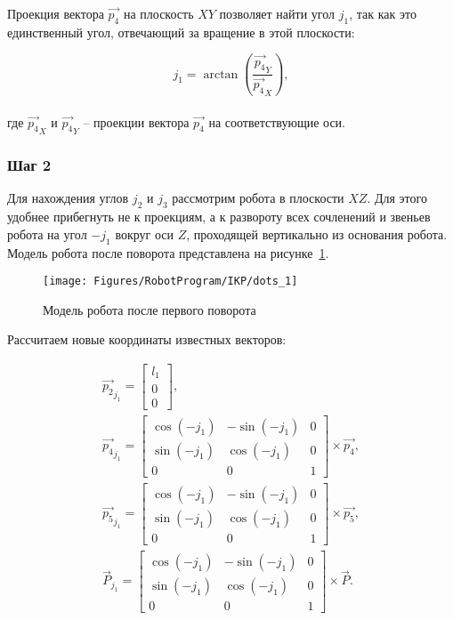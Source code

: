 Проекция вектора $\overrightarrow{p_4}$ на плоскость $XY$ позволяет найти угол $j_1$, так как это единственный угол, отвечающий за вращение в этой плоскости:

\begin{equation*}
    j_1 = \arctan \left( \dfrac{\overrightarrow{p_4}_Y}{\overrightarrow{p_4}_X} \right),
\end{equation*} \\
где $\overrightarrow{p_4}_X$ и $\overrightarrow{p_4}_Y$ -- проекции вектора $\overrightarrow{p_4}$ на соответствующие оси.

\subsubsection*{Шаг 2}
Для нахождения углов $j_2$ и $j_3$ рассмотрим робота в плоскости $XZ$.
Для этого удобнее прибегнуть не к проекциям, а к развороту всех сочленений и звеньев робота на угол $-j_1$ вокруг оси $Z$, проходящей вертикально из основания робота.
Модель робота после поворота представлена на рисунке~\ref{fig:RobotProgram:IKP:dots_1}.

\begin{figure}[H]
    \centering
    \vspace{14pt}
    \texttt{[image: Figures/RobotProgram/IKP/dots\_1]}
    \caption{Модель робота после первого поворота}
    \label{fig:RobotProgram:IKP:dots_1}
\end{figure}

Рассчитаем новые координаты известных векторов:

\begin{gather*}
    \overrightarrow{p_2}_{j_1} =
    \begin{bmatrix}
        l_1 \\
        0   \\
        0
    \end{bmatrix}, \\
    \overrightarrow{p_4}_{j_1} =
    \begin{bmatrix}
        \cos(-j_1) & -\sin(-j_1) & 0 \\
        \sin(-j_1) & \cos(-j_1)  & 0 \\
        0          & 0           & 1
    \end{bmatrix} \times \overrightarrow{p_4}, \\
    \overrightarrow{p_5}_{j_1} =
    \begin{bmatrix}
        \cos(-j_1) & -\sin(-j_1) & 0 \\
        \sin(-j_1) & \cos(-j_1)  & 0 \\
        0          & 0           & 1
    \end{bmatrix} \times \overrightarrow{p_5}, \\
    \overrightarrow{P}_{j_1} =
    \begin{bmatrix}
        \cos(-j_1) & -\sin(-j_1) & 0 \\
        \sin(-j_1) & \cos(-j_1)  & 0 \\
        0          & 0           & 1
    \end{bmatrix} \times \overrightarrow{P}.
\end{gather*} \\

